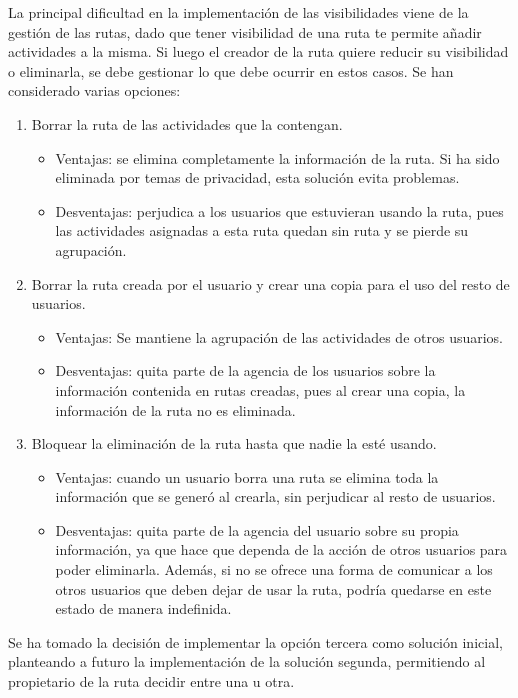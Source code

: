 La principal dificultad en la implementación de las visibilidades viene de la gestión de las rutas, dado que tener visibilidad de una ruta te permite añadir actividades a la misma. Si luego el creador de la ruta quiere reducir su visibilidad o eliminarla, se debe gestionar lo que debe ocurrir en estos casos. Se han considerado varias opciones:
\begin{enumerate}
    \item Borrar la ruta de las actividades que la contengan.
    \begin{itemize}
        \item Ventajas: se elimina completamente la información de la ruta. Si ha sido eliminada por temas de privacidad, esta solución evita problemas.
        \item Desventajas: perjudica a los usuarios que estuvieran usando la ruta, pues las actividades asignadas a esta ruta quedan sin ruta y se pierde su agrupación.
    \end{itemize}
    \item Borrar la ruta creada por el usuario y crear una copia para el uso del resto de usuarios.
    \begin{itemize}
        \item Ventajas: Se mantiene la agrupación de las actividades de otros usuarios.
        \item Desventajas: quita parte de la agencia de los usuarios sobre la información contenida en rutas creadas, pues al crear una copia, la información de la ruta no es eliminada.
    \end{itemize}
    \item Bloquear la eliminación de la ruta hasta que nadie la esté usando.
        \begin{itemize}
        \item Ventajas: cuando un usuario borra una ruta se elimina toda la información que se generó al crearla, sin perjudicar al resto de usuarios.
        \item Desventajas: quita parte de la agencia del usuario sobre su propia información, ya que hace que dependa de la acción de otros usuarios para poder eliminarla. Además, si no se ofrece una forma de comunicar a los otros usuarios que deben dejar de usar la ruta, podría quedarse en este estado de manera indefinida.
    \end{itemize}
\end{enumerate}

Se ha tomado la decisión de implementar la opción tercera como solución inicial, planteando a futuro la implementación de la solución segunda, permitiendo al propietario de la ruta decidir entre una u otra. 

